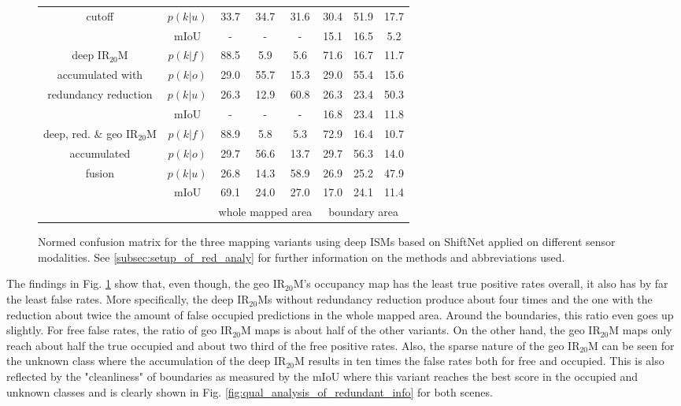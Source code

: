 \begin{figure}[H]
\begin{center}
{\begin{tabular}{c|c|ccc|ccc}
			cutoff &$p(k|u)$ & 33.7 & 34.7 & 31.6& 30.4 & 51.9 & 17.7 \\
			& mIoU & - & - & - &15.1&16.5&5.2 \\			
			\hline
			deep IR$_{20}$M &$p(k|f)$ & \textcolor{mygreen}{88.5} & \textcolor{myred}{5.9} & 5.6& \textcolor{mygreen}{71.6} & \textcolor{myred}{16.7} & 11.7 \\
			accumulated with &$p(k|o)$ & \textcolor{myred}{29.0} & \textcolor{mygreen}{55.7} & 15.3& \textcolor{myred}{29.0} & \textcolor{mygreen}{55.4} & 15.6 \\
			redundancy reduction &$p(k|u)$ & 26.3 & 12.9 & 60.8& 26.3 & 23.4 & 50.3 \\
			& mIoU & - & - & - &16.8&23.4&11.8 \\
			\hline
			deep, red. \& geo IR$_{20}$M  &$p(k|f)$ & \textcolor{mygreen}{88.9} & \textcolor{myred}{5.8} & 5.3& \textcolor{mygreen}{72.9} & \textcolor{myred}{16.4} & 10.7 \\
			accumulated&$p(k|o)$ & \textcolor{myred}{29.7} & \textcolor{mygreen}{56.6} & 13.7& \textcolor{myred}{29.7} & \textcolor{mygreen}{56.3} & 14.0 \\
			fusion&$p(k|u)$ & 26.8 & 14.3 & 58.9& 26.9 & 25.2 & 47.9 \\
			& mIoU &69.1&24.0&27.0&17.0&24.1&11.4 \\
			\hline
			& & \multicolumn{3}{c|}{\scriptsize{whole mapped area}} & \multicolumn{3}{c}{\scriptsize{boundary area}}
		\end{tabular}}
		\caption{\label{tab:conf_mat_redunt_info}Normed confusion matrix for the three mapping variants using deep ISMs based on ShiftNet applied on different sensor modalities. See \ref{subsec:setup_of_red_analy} for further information on the methods and abbreviations used.}
	\end{center}
\end{figure}
The findings in Fig. \ref{tab:conf_mat_redunt_info} show that, even though, the geo IR$_{20}$M's occupancy map has the least true positive rates overall, it also has by far the least false rates. More specifically, the deep IR$_{20}$Ms without redundancy reduction produce about four times and the one with the reduction about twice the amount of false occupied predictions in the whole mapped area. Around the boundaries, this ratio even goes up slightly. For free false rates, the ratio of geo IR$_{20}$M maps is about half of the other variants. On the other hand, the geo IR$_{20}$M maps only reach about half the true occupied and about two third of the free positive rates. Also, the sparse nature of the geo IR$_{20}$M can be seen for the unknown class where the accumulation of the deep IR$_{20}$M results in ten times the false rates both for free and occupied. This is also reflected by the "cleanliness" of boundaries as measured by the mIoU where this variant reaches the best score in the occupied and unknown classes and is clearly shown in Fig. \ref{fig:qual_analysis_of_redundant_info} for both scenes.

